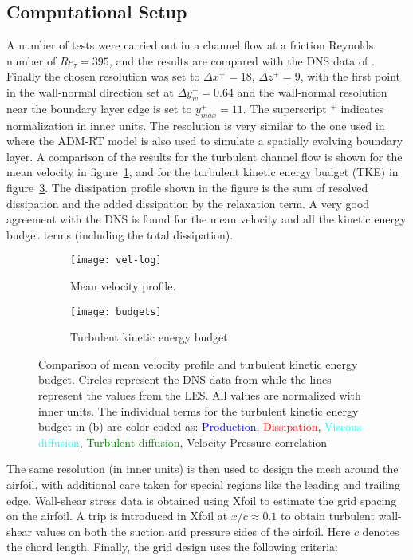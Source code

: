 \subsection{Computational Setup}
A number of tests were carried out in a channel flow at a friction Reynolds number of $Re_{\tau}=395$, and the results are compared with the DNS data of \cite{moser99}. Finally the chosen resolution was set to $\Delta x^{+}=18$, $\Delta z^{+}=9$, with the first point in the wall-normal direction set at $\Delta y_{w}^{+}=0.64$ and the wall-normal resolution near the boundary layer edge is set to $y_{max}^{+}=11$. The superscript $^{+}$ indicates normalization in inner units. The resolution is very similar to the one used in \cite{eitel14} where the ADM-RT model is also used to simulate a spatially evolving boundary layer. A comparison of the results for the turbulent channel flow is shown for the mean velocity in figure~\ref{fig:vel_mean}, and for the turbulent kinetic energy budget (TKE) in figure~\ref{fig:budget}. The dissipation profile shown in the figure is the sum of resolved dissipation and the added dissipation by the relaxation term. A very good agreement with the DNS is found for the mean velocity and all the kinetic energy budget terms (including the total dissipation).

\begin{figure}[h]
	\begin{subfigure}[t]{0.5\textwidth}
		\centering
		\texttt{[image: vel-log]}
		\caption{Mean velocity profile.}
		\label{fig:vel_mean}
	\end{subfigure}	
	\begin{subfigure}[t]{0.5\textwidth}
		\centering
		\texttt{[image: budgets]}
		\caption{Turbulent kinetic energy budget}
		\label{fig:budget}
	\end{subfigure}
	\caption{Comparison of mean velocity profile and turbulent kinetic energy budget. Circles represent the DNS data from \cite{moser99} while the lines represent the values from the LES. All values are normalized with inner units. The individual terms for the turbulent kinetic energy budget in (b) are color coded as: \textcolor{blue}{Production}, \textcolor{red}{Dissipation}, \textcolor{cyan}{Viscous diffusion}, \textcolor{green}{Turbulent diffusion}, \textcolor{mygray}{Velocity-Pressure correlation}}
\end{figure}

The same resolution (in inner units) is then used to design the mesh around the airfoil, with additional care taken for special regions like the leading and trailing edge. Wall-shear stress data is obtained using Xfoil to estimate the grid spacing on the airfoil. A trip is introduced in Xfoil at $x/c\approx0.1$ to obtain turbulent wall-shear values on both the suction and pressure sides of the airfoil. Here $c$ denotes the chord length. Finally, the grid design uses the following criteria:

